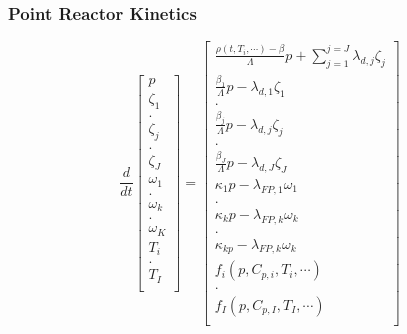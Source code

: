 \begin{frame}
\frametitle{Point Reactor Kinetics}
\begin{equation}
\frac{d}{dt}\left[
    \begin{array}{c}
      p\\
      \zeta_1\\
      .\\
      \zeta_j\\
      .\\
      \zeta_J\\
      \omega_1\\
      .\\
      \omega_k\\
      .\\
      \omega_K\\
      T_{i}\\
      .\\
      T_{I}\\
    \end{array}
    \right]
    =
    \left[
      \begin{array}{ c }
        \frac{\rho(t,T_{i},\cdots)-\beta}{\Lambda}p +
        \displaystyle\sum^{j=J}_{j=1}\lambda_{d,j}\zeta_j\\
        \frac{\beta_1}{\Lambda} p - \lambda_{d,1}\zeta_1\\
        .\\
        \frac{\beta_j}{\Lambda}p-\lambda_{d,j}\zeta_j\\
        .\\
        \frac{\beta_J}{\Lambda}p-\lambda_{d,J}\zeta_J\\
        \kappa_1p - \lambda_{FP,1}\omega_1\\
        .\\
        \kappa_kp - \lambda_{FP,k}\omega_k\\
        .\\
        \kappa_{k p} - \lambda_{FP,k}\omega_{k}\\
        f_{i}(p, C_{p,i}, T_{i}, \cdots)\\
        .\\
        f_{I}(p, C_{p,I}, T_{I}, \cdots)\\
      \end{array}
      \right]
\end{equation}
\end{frame}

